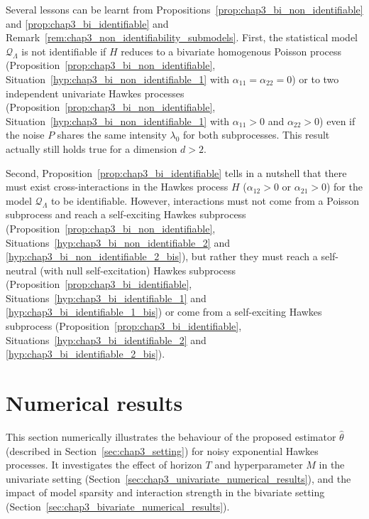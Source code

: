       Several lessons can be learnt from Propositions~\ref{prop:chap3_bi_non_identifiable} and \ref{prop:chap3_bi_identifiable} and Remark~\ref{rem:chap3_non_identifiability_submodels}.
      First, the statistical model $\mathcal Q_\Lambda$ is not identifiable if
      $H$ reduces to a bivariate homogenous Poisson process (Proposition~\ref{prop:chap3_bi_non_identifiable}, Situation~\ref{hyp:chap3_bi_non_identifiable_1} with $\alpha_{11}=\alpha_{22}=0$)
      or to two independent univariate Hawkes processes (Proposition~\ref{prop:chap3_bi_non_identifiable}, Situation~\ref{hyp:chap3_bi_non_identifiable_1} with $\alpha_{11} >0$ and $\alpha_{22}>0$)
      even if the noise $P$ shares the same intensity $\lambda_0$ for both subprocesses.
      This result actually still holds true for a dimension $d > 2$.
      
      Second, Proposition~\ref{prop:chap3_bi_identifiable} tells in a nutshell that there must exist cross-interactions in the Hawkes process $H$ (\ie $\alpha_{12} > 0$ or $\alpha_{21} > 0$) for the model $\mathcal Q_\Lambda$ to be identifiable.
      However,
      interactions must not come from a Poisson subprocess and reach a self-exciting Hawkes subprocess (Proposition~\ref{prop:chap3_bi_non_identifiable}, Situations~\ref{hyp:chap3_bi_non_identifiable_2} and \ref{hyp:chap3_bi_non_identifiable_2_bis}),
      but rather they must reach a self-neutral (\ie with null self-excitation) Hawkes subprocess (Proposition~\ref{prop:chap3_bi_identifiable}, Situations~\ref{hyp:chap3_bi_identifiable_1} and \ref{hyp:chap3_bi_identifiable_1_bis}) 
      or come from a self-exciting Hawkes subprocess
      (Proposition~\ref{prop:chap3_bi_identifiable}, Situations~\ref{hyp:chap3_bi_identifiable_2} and \ref{hyp:chap3_bi_identifiable_2_bis}).


                
        

        
\section{Numerical results}\label{sec:chap3_numerical_results}
        
  This section numerically illustrates the behaviour of the proposed estimator $\hat \theta$ (described in Section~\ref{sec:chap3_setting})
  for noisy exponential Hawkes processes.
  It investigates the effect of horizon $T$ and hyperparameter $M$ in the univariate setting (Section~\ref{sec:chap3_univariate_numerical_results}),
  and the impact of model sparsity and interaction strength in the bivariate setting (Section~\ref{sec:chap3_bivariate_numerical_results}).
  

